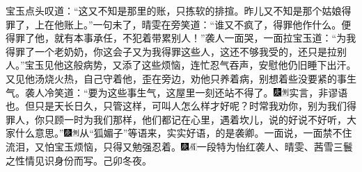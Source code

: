 宝玉点头叹道：``这又不知是那里的账，只拣软的排揎。昨儿又不知是那个姑娘得罪了，上在他账上。''一句未了，晴雯在旁笑道：``谁又不疯了，得罪他作什么。便得罪了他，就有本事承任，不犯着带累别人！''袭人一面哭，一面拉宝玉道：``为我得罪了一个老奶奶，你这会子又为我得罪这些人，这还不够我受的，还只是拉别人。''宝玉见他这般病势，又添了这些烦恼，连忙忍气吞声，安慰他仍旧睡下出汗。又见他汤烧火热，自己守着他，歪在旁边，劝他只养着病，别想着些没要紧的事生气。袭人冷笑道：``要为这些事生气，这屋里一刻还站不得了。{\includegraphics[width=3mm]{../Images/00004}\includegraphics[width=3mm]{../Images/00011}\footnotesize \kaishu 实言，非谬语也。}但只是天长日久，只管这样，可叫人怎么样才好呢？时常我劝你，别为我们得罪人，你只顾一时为我们那样，他们都记在心里，遇着坎儿，说的好说不好听，大家什么意思。''{\includegraphics[width=3mm]{../Images/00004}\includegraphics[width=3mm]{../Images/00011}\footnotesize \kaishu 从``狐媚子''等语来，实实好语，的是袭卿。}一面说，一面禁不住流泪，又怕宝玉烦恼，只得又勉强忍着。{\includegraphics[width=3mm]{../Images/00004}\includegraphics[width=3mm]{../Images/00010}\footnotesize \kaishu 一段特为怡红袭人、晴雯、茜雪三鬟之性情见识身份而写。己卯冬夜。}

